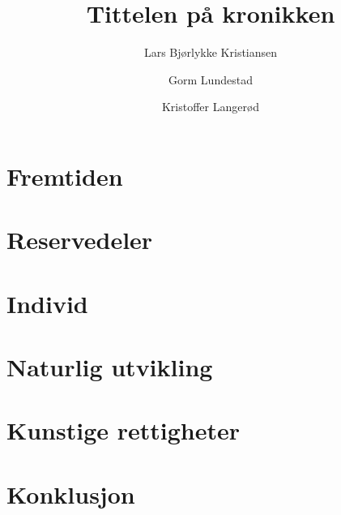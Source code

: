 \documentclass[norsk]{inf0105}
\title{Tittelen på kronikken}
\author{Lars Bjørlykke Kristiansen
	\and Gorm Lundestad
	\and Kristoffer Langerød}
\begin{document}
\maketitle

\begin{ingress}
	
\end{ingress}

\section*{Fremtiden}

\section*{Reservedeler}

\section*{Individ}

\section*{Naturlig utvikling}

\section*{Kunstige rettigheter}

\section*{Konklusjon}

\end{document}
